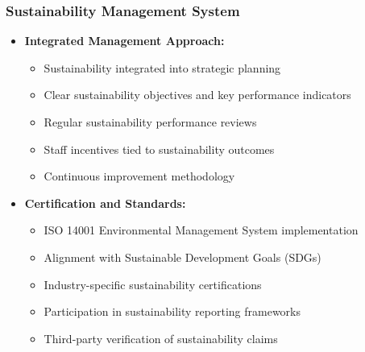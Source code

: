 \subsubsection{Sustainability Management System}
\begin{itemize}
    \item \textbf{Integrated Management Approach:}
    \begin{itemize}
        \item Sustainability integrated into strategic planning
        \item Clear sustainability objectives and key performance indicators
        \item Regular sustainability performance reviews
        \item Staff incentives tied to sustainability outcomes
        \item Continuous improvement methodology
    \end{itemize}
    
    \item \textbf{Certification and Standards:}
    \begin{itemize}
        \item ISO 14001 Environmental Management System implementation
        \item Alignment with Sustainable Development Goals (SDGs)
        \item Industry-specific sustainability certifications
        \item Participation in sustainability reporting frameworks
        \item Third-party verification of sustainability claims
    \end{itemize}
\end{itemize}

